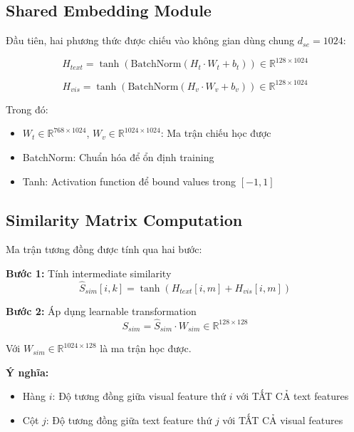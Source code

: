 \documentclass[12pt,a4paper]{article}
\begin{document}
\subsection{Shared Embedding Module}

Đầu tiên, hai phương thức được chiếu vào không gian dùng chung $d_{se} = 1024$:

\begin{equation}
H_{text} = \tanh(\text{BatchNorm}(H_t \cdot W_t + b_t)) \in \mathbb{R}^{128 \times 1024}
\label{eq:text_proj}
\end{equation}

\begin{equation}
H_{vis} = \tanh(\text{BatchNorm}(H_v \cdot W_v + b_v)) \in \mathbb{R}^{128 \times 1024}
\label{eq:vis_proj}
\end{equation}

Trong đó:
\begin{itemize}
    \item $W_t \in \mathbb{R}^{768 \times 1024}$, $W_v \in \mathbb{R}^{1024 \times 1024}$: Ma trận chiếu học được
    \item BatchNorm: Chuẩn hóa để ổn định training
    \item Tanh: Activation function để bound values trong $[-1, 1]$
\end{itemize}

\subsection{Similarity Matrix Computation}

Ma trận tương đồng được tính qua hai bước:

\textbf{Bước 1:} Tính intermediate similarity
\begin{equation}
\hat{S}_{sim}[i,k] = \tanh(H_{text}[i,m] + H_{vis}[i,m])
\end{equation}

\textbf{Bước 2:} Áp dụng learnable transformation
\begin{equation}
S_{sim} = \hat{S}_{sim} \cdot W_{sim} \in \mathbb{R}^{128 \times 128}
\label{eq:similarity}
\end{equation}

Với $W_{sim} \in \mathbb{R}^{1024 \times 128}$ là ma trận học được.

\textbf{Ý nghĩa:}
\begin{itemize}
    \item Hàng $i$: Độ tương đồng giữa visual feature thứ $i$ với TẤT CẢ text features
    \item Cột $j$: Độ tương đồng giữa text feature thứ $j$ với TẤT CẢ visual features
\end{itemize}
\end{document}

